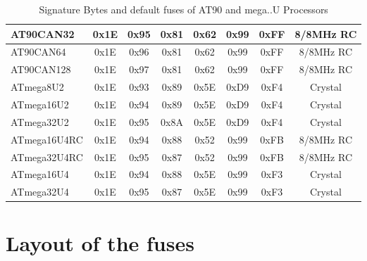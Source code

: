 \begin{table}[H]
\begin{center}
\begin{tabular}{| l | c | c | c || c | c | c | c |}
    \hline
AT90CAN32 & 0x1E & 0x95  & 0x81 & 0x62 & 0x99 & 0xFF & 8/8MHz RC \\
    \hline
AT90CAN64 & 0x1E & 0x96  & 0x81 & 0x62 & 0x99 & 0xFF & 8/8MHz RC \\
    \hline
AT90CAN128 & 0x1E & 0x97  & 0x81 & 0x62 & 0x99 & 0xFF & 8/8MHz RC \\
    \hline
ATmega8U2  & 0x1E & 0x93  & 0x89 & 0x5E & 0xD9 & 0xF4 & Crystal \\
    \hline
ATmega16U2 & 0x1E & 0x94  & 0x89 & 0x5E & 0xD9 & 0xF4 & Crystal \\
    \hline
ATmega32U2 & 0x1E & 0x95  & 0x8A & 0x5E & 0xD9 & 0xF4 & Crystal \\
    \hline
ATmega16U4RC & 0x1E & 0x94  & 0x88 & 0x52 & 0x99 & 0xFB & 8/8MHz RC \\
    \hline
ATmega32U4RC & 0x1E & 0x95  & 0x87 & 0x52 & 0x99 & 0xFB & 8/8MHz RC \\
    \hline
ATmega16U4 & 0x1E & 0x94  & 0x88 & 0x5E & 0x99 & 0xF3 & Crystal \\
    \hline
ATmega32U4 & 0x1E & 0x95  & 0x87 & 0x5E & 0x99 & 0xF3 & Crystal \\
    \hline
    \end{tabular}
  \end{center}
  \caption{Signature Bytes and default fuses of AT90 and mega..U Processors}
  \label{tab:at90Signature}
\end{table}


\section{Layout of the fuses}


